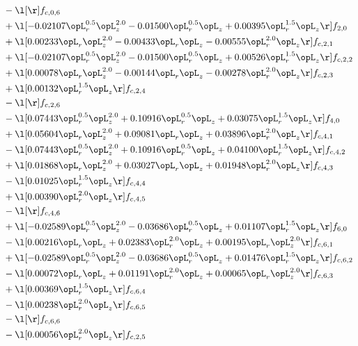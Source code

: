 \begin{alignat}{2}
& - \l[  \r] f_{c,0,6} \nonumber \\ 
& + \l[  -0.02107 \opL_r^{0.5} \opL_z^{2.0}   -0.01500 \opL_r^{0.5} \opL_z +  0.00395 \opL_r^{1.5} \opL_z  \r] f_{2,0} \nonumber \\ 
& + \l[  0.00233 \opL_r \opL_z^{2.0}   -0.00433 \opL_r \opL_z   -0.00555 \opL_r^{2.0} \opL_z  \r] f_{c,2,1} \nonumber \\ 
& + \l[  -0.02107 \opL_r^{0.5} \opL_z^{2.0}   -0.01500 \opL_r^{0.5} \opL_z +  0.00526 \opL_r^{1.5} \opL_z  \r] f_{c,2,2} \nonumber \\ 
& + \l[  0.00078 \opL_r \opL_z^{2.0}   -0.00144 \opL_r \opL_z   -0.00278 \opL_r^{2.0} \opL_z  \r] f_{c,2,3} \nonumber \\ 
& + \l[  0.00132 \opL_r^{1.5} \opL_z  \r] f_{c,2,4} \nonumber \\ 
& - \l[  \r] f_{c,2,6} \nonumber \\ 
& - \l[  0.07443 \opL_r^{0.5} \opL_z^{2.0} +  0.10916 \opL_r^{0.5} \opL_z +  0.03075 \opL_r^{1.5} \opL_z  \r] f_{4,0} \nonumber \\ 
& + \l[  0.05604 \opL_r \opL_z^{2.0} +  0.09081 \opL_r \opL_z +  0.03896 \opL_r^{2.0} \opL_z  \r] f_{c,4,1} \nonumber \\ 
& - \l[  0.07443 \opL_r^{0.5} \opL_z^{2.0} +  0.10916 \opL_r^{0.5} \opL_z +  0.04100 \opL_r^{1.5} \opL_z  \r] f_{c,4,2} \nonumber \\ 
& + \l[  0.01868 \opL_r \opL_z^{2.0} +  0.03027 \opL_r \opL_z +  0.01948 \opL_r^{2.0} \opL_z  \r] f_{c,4,3} \nonumber \\ 
& - \l[  0.01025 \opL_r^{1.5} \opL_z  \r] f_{c,4,4} \nonumber \\ 
& + \l[  0.00390 \opL_r^{2.0} \opL_z  \r] f_{c,4,5} \nonumber \\ 
& - \l[  \r] f_{c,4,6} \nonumber \\ 
& + \l[  -0.02589 \opL_r^{0.5} \opL_z^{2.0}   -0.03686 \opL_r^{0.5} \opL_z +  0.01107 \opL_r^{1.5} \opL_z  \r] f_{6,0} \nonumber \\ 
& - \l[  0.00216 \opL_r \opL_z +  0.02383 \opL_r^{2.0} \opL_z +  0.00195 \opL_r \opL_z^{2.0}  \r] f_{c,6,1} \nonumber \\ 
& + \l[  -0.02589 \opL_r^{0.5} \opL_z^{2.0}   -0.03686 \opL_r^{0.5} \opL_z +  0.01476 \opL_r^{1.5} \opL_z  \r] f_{c,6,2} \nonumber \\ 
& - \l[  0.00072 \opL_r \opL_z +  0.01191 \opL_r^{2.0} \opL_z +  0.00065 \opL_r \opL_z^{2.0}  \r] f_{c,6,3} \nonumber \\ 
& + \l[  0.00369 \opL_r^{1.5} \opL_z  \r] f_{c,6,4} \nonumber \\ 
& - \l[  0.00238 \opL_r^{2.0} \opL_z  \r] f_{c,6,5} \nonumber \\ 
& - \l[  \r] f_{c,6,6} \nonumber \\ 
& - \l[  0.00056 \opL_r^{2.0} \opL_z  \r] f_{c,2,5} \nonumber \\ 
\end{alignat} 


